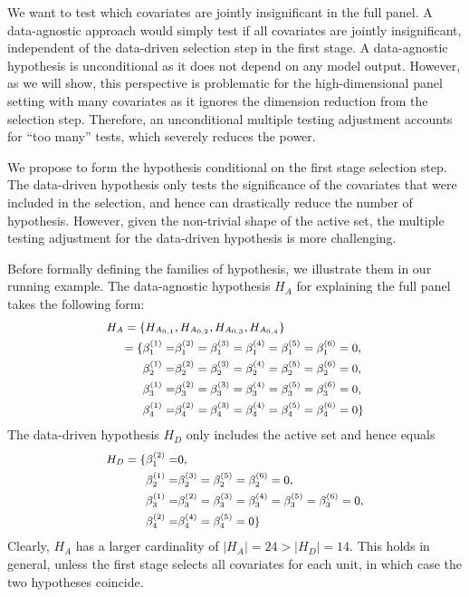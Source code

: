 \documentclass[11pt]{article}
\begin{document}
We want to test which covariates are jointly insignificant in the full panel. A data-agnostic approach would simply test if all covariates are jointly insignificant, independent of the data-driven selection step in the first stage. A data-agnostic hypothesis is unconditional as it does not depend on any model output. However, as we will show, this perspective is problematic for the high-dimensional panel setting with many covariates as it ignores the dimension reduction from the selection step. Therefore, an unconditional multiple testing adjustment accounts for ``too many'' tests, which severely reduces the power.


We propose to form the hypothesis conditional on the first stage selection step. The data-driven hypothesis only tests the significance of the covariates that were included in the selection, and hence can drastically reduce the number of hypothesis. However, given the non-trivial shape of the active set, the multiple testing adjustment for the data-driven hypothesis is more challenging. 

Before formally defining the families of hypothesis, we illustrate them in our running example. The data-agnostic hypothesis $H_A$ for explaining the full panel takes the following form: 
\begin{equation}\small
	\begin{split}
		H_A=\{
		H_{A_{0,1}}&,H_{A_{0,2}},H_{A_{0,3}},H_{A_{0,4}}
		\}\\=\{
		\beta^{(1)}_1=&\beta^{(2)}_1=\beta^{(3)}_1=\beta^{(4)}_1=\beta^{(5)}_1=\beta^{(6)}_1=0,\\
		\beta^{(1)}_2=&\beta^{(2)}_2=\beta^{(3)}_2=\beta^{(4)}_2=\beta^{(5)}_2=\beta^{(6)}_2=0,\\
		\beta^{(1)}_3=&\beta^{(2)}_3=\beta^{(3)}_3=\beta^{(4)}_3=\beta^{(5)}_3=\beta^{(6)}_3=0,\\
		\beta^{(1)}_4=&\beta^{(2)}_4=\beta^{(3)}_4=\beta^{(4)}_4=\beta^{(5)}_4=\beta^{(6)}_4=0\}
	\end{split}
\end{equation}
The data-driven hypothesis $H_D$ only includes the active set and hence equals
\begin{equation}\small
	\begin{split}
		H_D
		=\{
		\beta^{(2)}_1=&0,\\
		\beta^{(1)}_2=&\beta^{(3)}_2=\beta^{(5)}_2=\beta^{(6)}_2=0,\\
		\beta^{(1)}_3=&\beta^{(2)}_3=\beta^{(3)}_3=\beta^{(4)}_3=\beta^{(5)}_3=\beta^{(6)}_3=0,\\
		\beta^{(2)}_4=&\beta^{(4)}_4=\beta^{(5)}_4=0\}
	\end{split}
\end{equation}
Clearly, $H_A$ has a larger cardinality of $|H_A|=24>|H_D|=14$. This holds in general, unless the first stage selects all covariates for each unit, in which case the two hypotheses coincide. 
\end{document}

